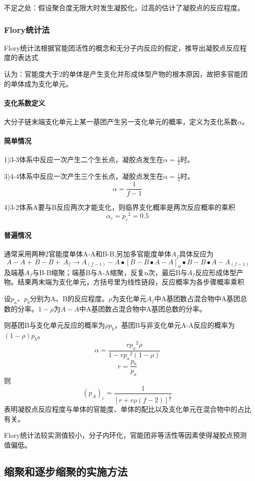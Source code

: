 ﻿\documentclass[12pt,a4paper]{article}
\begin{document}
不足之处：假设聚合度无限大时发生凝胶化，过高的估计了凝胶点的反应程度。
\subsubsection{Flory统计法}
Flory统计法根据官能团活性的概念和无分子内反应的假定，推导出凝胶点反应程度的表达式

认为：官能度大于2的单体是产生支化并形成体型产物的根本原因，故把多官能团的单体成为支化单元。

\paragraph{支化系数定义}大分子链末端支化单元上某一基团产生另一支化单元的概率，定义为支化系数$\alpha$。
\paragraph{简单情况}

1)3-3体系中反应一次产生二个生长点，凝胶点发生在$\alpha=\frac{1}{2}$时。

3)4-4体系中反应一次产生三个生长点，凝胶点发生在$\alpha=\frac{1}{3}$时。
$$\alpha = \frac{1}{f-1}$$

4)3-2体系A要与B反应两次才能支化，则临界支化概率是两次反应概率的乘积$$\alpha_c = {p_c}^2=0.5$$
\paragraph{普遍情况}
通常采用两种2官能度单体A-A和B-B,另加多官能度单体$A_f$具体反应为$$\,A-A+\,B-B+\,A_f \longrightarrow A_{(f-1)}-A\bullet [B-B\bullet A-A]_n\bullet B-B\bullet A-A_{(f-1)}$$
及端基$A_f$与B-B缩聚；端基B与A-A缩聚，反复n次，最后B与$A_f$反应形成体型产物。结果两末端为支化单元，方括号里为线性链段，反应概率为各步骤概率乘积

设$p_a$、$p_b$分别为A、B的反应程度。$\rho$为支化单元$A_f$中A基团数占混合物中A基团总数的分率。$1-\rho$为$A-A$中A基团数占混合物中A基团总数的分率。

则基团B与支化单元反应的概率为$ \rho p_b$，基团B与非支化单元A-A反应的概率为$(1-\rho)p_b$。
$$\alpha=\frac{r{p_a}^2\rho}{1-r{p_a}^2(1-\rho)}$$
$$r=\frac{p_b}{p_a}$$
则$$(p_A)_c=\frac{1}{[r+r\rho(f-2)]^{\frac{1}{2}}}$$
表明凝胶点反应程度与单体的官能度、单体的配比以及支化单元在混合物中的占比有关。

Flory统计法较实测值较小，分子内环化，官能团非等活性等因素使得凝胶点预测值偏低。
\subsection{缩聚和逐步缩聚的实施方法}
\end{document}
